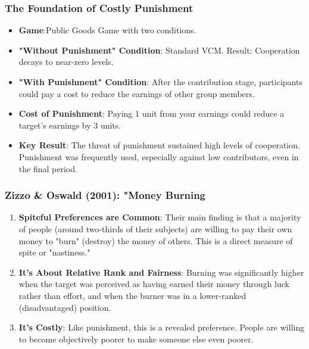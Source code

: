 \documentclass[10pt]{beamer}
\begin{document}
\begin{frame}
  \label{slide:cost}
  \frametitle{\large The Foundation of Costly Punishment}
  \begin{itemize}
    \item \textbf{Game}:Public Goods Game with two conditions.
    \item \textbf{"Without Punishment" Condition}: Standard VCM. Result: Cooperation decays to near-zero levels.
    \item \textbf{"With Punishment" Condition}: After the contribution stage, participants could pay a cost to reduce the earnings of other group members.
    \item \textbf{Cost of Punishment}: Paying 1 unit from your earnings could reduce a target's earnings by 3 units.
    \item \textbf{Key Result}: The threat of punishment sustained high levels of cooperation. Punishment was frequently used, especially against low contributors, even in the final period.
  \end{itemize}
  \hyperlink{slide:Mapping}{}
\end{frame}

\begin{frame}
  \label{slide:games}
  \frametitle{\large Zizzo \& Oswald (2001): "Money Burning}
  \begin{enumerate}
    \item \textbf{Spiteful Preferences are Common}: Their main finding is that a majority of people (around two-thirds of their subjects) are willing to pay their own money to "burn" (destroy) the money of others. This is a direct measure of spite or "nastiness."
    \item \textbf{It's About Relative Rank and Fairness}: Burning was significantly higher when the target was perceived as having earned their money through luck rather than effort, and when the burner was in a lower-ranked (disadvantaged) position.
    \item \textbf{It's Costly}: Like punishment, this is a revealed preference. People are willing to become objectively poorer to make someone else even poorer.
  \end{enumerate}
  \hyperlink{slide:Mapping}{}
\end{frame}
\end{document}
